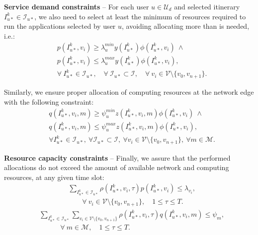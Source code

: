 \textbf{Service demand constraints} -- For each user $u \in \mathcal{U}_d$ and {selected} itinerary $I_{u*}^k \in \mathcal{I}_{u*}$, we also need to select at least the minimum of resources required to run the applications {selected} by user $u$, avoiding allocating more than is needed, i.e.:
\begin{equation}
\label{eq:service_demand_net}
\begin{split}
& p(I_{u*}^k,v_{i}) \geq \lambda_{u}^{min}y(I_{u*}^k)\phi(I_{u*}^k, v_{i}) \ \land \\
& p(I_{u*}^k,v_{i}) \leq \lambda_{u}^{max}y(I_{u*}^k)\phi(I_{u*}^k, v_{i}), \\
& {\forall \ I_{u*}^k \in \mathcal{I}_{u*}}, {\quad \forall \ \mathcal{I}_{u*} \subset \mathcal{I}}, {\quad \forall \ v_{i} \in \mathcal{V} \setminus \{v_{0}, v_{n+1}\}}.
\end{split}
\end{equation}  

Similarly, we ensure proper allocation of computing resources at the network edge with the following constraint:
\begin{equation}
\label{eq:service_demand_mec}
\begin{split}
& q(I_{u*}^k,v_{i},m) \geq \psi_{u}^{min}z(I_{u*}^k,v_{i},m)\phi(I_{u*}^k, v_{i}) \ \land \\
& q(I_{u*}^k,v_{i},m) \leq \psi_{u}^{max}z(I_{u*}^k,v_{i},m)\phi(I_{u*}^k, v_{i}), \\
& {\forall I_{u*}^k \in \mathcal{I}_{u*}}, {\ \forall \mathcal{I}_{u*} \subset \mathcal{I}}, {\ \forall v_{i} \in \mathcal{V} \setminus \{v_{0}, v_{n+1}\}}, {\ \forall m \in \mathcal{M}}.
\end{split}
\end{equation}

\textbf{Resource capacity constraints} -- Finally, we assure that the performed allocations do not exceed the amount of available network and computing resources, at any given time slot:
\begin{equation}
\label{eq:bs_capacity}
\begin{split}
& \sum\limits_{I_{u*}^k \in \mathcal{I}_{u*}} \rho(I_{u*}^k, v_{i}, \tau)p(I_{u*}^k,v_{i}){\leq \lambda_{v_{i}},} \\
& \qquad {\forall \ v_{i} \in \mathcal{V} \setminus \{v_{0}, v_{n+1}\},} {\quad 1 \leq \tau \leq T}.
\end{split}
\end{equation}
\begin{equation}
\label{eq:mec_capacity}
\begin{split}
&\sum\limits_{I_{u*}^k \in \mathcal{I}_{u*}} \sum\limits_{v_{i} \in \mathcal{V} \setminus \{v_{0}, v_{n+1}\}} \rho(I_{u*}^k, v_{i}, \tau) q(I_{u*}^k,v_{i},m){\leq {\psi}_{m},}\\
& \qquad\quad {\forall \ m \in \mathcal{M},} {\quad 1 \leq \tau \leq T}.
\end{split}
\end{equation}

